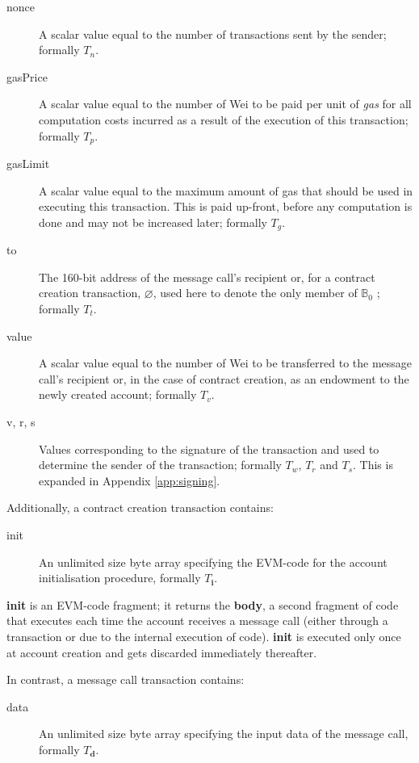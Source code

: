 \documentclass[9pt,oneside]{amsart}
\begin{document}
\begin{multicols}{2}
\begin{description}
\item[nonce] A scalar value equal to the number of transactions sent by the sender; formally $T_n$.
\item[gasPrice] A scalar value equal to the number of Wei to be paid per unit of \textit{gas} for all computation costs incurred as a result of the execution of this transaction; formally $T_p$.
\item[gasLimit] A scalar value equal to the maximum amount of gas that should be used in executing this transaction. This is paid up-front, before any computation is done and may not be increased later; formally $T_g$.
\item[to] The 160-bit address of the message call's recipient or, for a contract creation transaction, $\varnothing$, used here to denote the only member of $\mathbb{B}_0$ ; formally $T_t$.
\item[value] A scalar value equal to the number of Wei to be transferred to the message call's recipient or, in the case of contract creation, as an endowment to the newly created account; formally $T_v$.
\item[v, r, s] Values corresponding to the signature of the transaction and used to determine the sender of the transaction; formally $T_w$, $T_r$ and $T_s$. This is expanded in Appendix \ref{app:signing}.
\end{description}

Additionally, a contract creation transaction contains:

\begin{description}
\item[init] An unlimited size byte array specifying the EVM-code for the account initialisation procedure, formally $T_\mathbf{i}$.
\end{description}

\textbf{init} is an EVM-code fragment; it returns the \textbf{body}, a second fragment of code that executes each time the account receives a message call (either through a transaction or due to the internal execution of code). \textbf{init} is executed only once at account creation and gets discarded immediately thereafter.

In contrast, a message call transaction contains:

\begin{description}
\item[data] An unlimited size byte array specifying the input data of the message call, formally $T_\mathbf{d}$.
\end{description}


\end{multicols}
\end{document}
